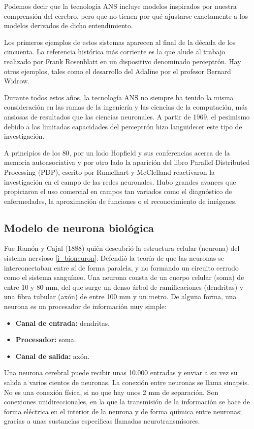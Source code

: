 \documentclass[12pt]{book} %
\begin{document}
			Podemos decir que la tecnología ANS incluye modelos inspirados por nuestra comprensión del cerebro, pero que no tienen por qué ajustarse
			exactamente a los modelos derivados de dicho entendimiento.
			
			Los primeros ejemplos de estos sistemas aparecen al final de la década de los cincuenta. La referencia histórica más corriente es la que 
			alude al trabajo realizado por Frank Rosenblatt en un dispositivo denominado perceptrón. Hay otros ejemplos, tales como el desarrollo del
			Adaline por el profesor Bernard Widrow.
			
			Durante todos estos años, la tecnología ANS no siempre ha tenido la misma consideración en las ramas de la ingeniería y las ciencias de 
			la computación, más ansiosas de resultados que las ciencias neuronales. A partir de 1969, el pesimismo debido a las limitadas capacidades
			del perceptrón hizo languidecer este tipo de investigación.
			
			A principios de los 80, por un lado Hopfield y sus conferencias acerca de la memoria autoasociativa y por otro lado la aparición del libro
			Parallel Distributed Processing (PDP), escrito por Rumelhart y McClelland reactivaron la investigación en el campo de las redes neuronales.
			Hubo grandes avances que propiciaron el uso comercial en campos tan variados como el diagnóstico de enfermedades, la aproximación de 
			funciones o el reconocimiento de imágenes.
			
		\subsection{Modelo de neurona biológica}
			Fue Ramón y Cajal (1888) quién descubrió la estructura celular (neurona) del sistema nervioso \ref{i_bioneuron}.  Defendió la teoría de que 
			las neuronas se interconectaban entre sí de forma paralela, y no formando un circuito cerrado como el sistema sanguíneo.
			Una neurona consta de un cuerpo celular (soma) de entre 10 y 80 mm, del que surge un denso árbol de ramificaciones (dendritas) y una fibra
			tubular (axón) de entre 100 mm y un metro.
			De alguna forma, una neurona es un procesador de información muy simple:
			\begin{itemize}
				\item  \textbf{ Canal de entrada:} dendritas.
				\item \textbf{Procesador:} soma.
				\item \textbf{Canal de salida:} axón.
			\end{itemize}
	        Una neurona cerebral puede recibir unas 10.000 entradas y enviar a su vez su salida a varios cientos de neuronas.
	        La conexión entre neuronas se llama sinapsis. No es una conexión física, si no que hay unos 2 mm de separación. Son conexiones
	        unidireccionales, en la que la transmisión de la información se hace de forma eléctrica en el interior de la neurona y de forma química entre
	        neuronas; gracias a unas sustancias específicas llamadas neurotransmisores.
\end{document}
